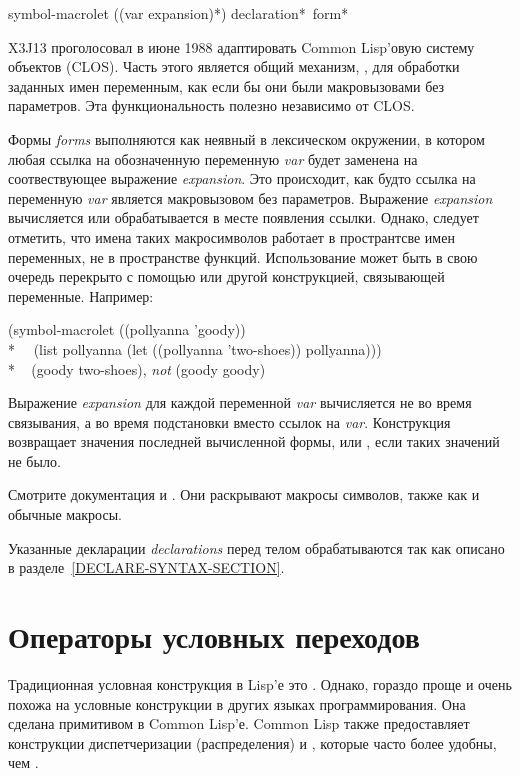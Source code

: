 \begin{defspec}
symbol-macrolet ({(var expansion)}*)
                {declaration}* {\,form}*

X3J13 проголосовал в июне 1988
адаптировать Common Lisp'овую систему объектов (CLOS). Часть этого является
общий механизм, , для обработки заданных имен переменным,
как если бы они были макровызовами без параметров. Эта функциональность
полезно независимо от CLOS.

Формы \emph{forms} выполняются как неявный  в лексическом окружении,
в котором любая ссылка на обозначенную переменную \emph{var} будет заменена на
соотвествующее выражение \emph{expansion}. Это происходит, как будто ссылка на
переменную \emph{var} является макровызовом без параметров.
Выражение \emph{expansion} вычисляется или обрабатывается в месте появления
ссылки. Однако, следует отметить, что имена таких макросимволов работает в
пространтсве имен переменных, не в пространстве функций. 
Использование  может быть в свою очередь перекрыто с
помощью  или другой конструкцией, связывающей переменные. Например:
\begin{lisp}
(symbol-macrolet ((pollyanna 'goody)) \\*
~~(list pollyanna (let ((pollyanna 'two-shoes)) pollyanna))) \\*
~{\EV} (goody two-shoes)\textrm{, \emph{not}} (goody goody)
\end{lisp}

Выражение \emph{expansion} для каждой переменной \emph{var} вычисляется не во
время связывания, а во время подстановки вместо ссылок на \emph{var}.
Конструкция возвращает значения последней вычисленной формы, или , если
таких значений не было.

Смотрите документация  и . Они раскрывают
макросы символов, также как и обычные макросы.

Указанные декларации \emph{declarations} перед телом обрабатываются так как
описано в разделе~\ref{DECLARE-SYNTAX-SECTION}.
\end{defspec}

\section{Операторы условных переходов}

Традиционная условная конструкция в Lisp'е это .
Однако,  гораздо проще и очень похожа на условные конструкции в других
языках программирования. Она сделана примитивом в Common Lisp'е.
Common Lisp также предоставляет конструкции диспетчеризации (распределения)
 и , которые часто более удобны, чем .

